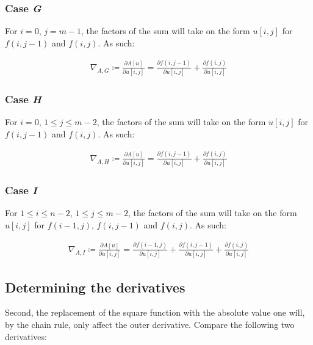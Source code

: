 \documentclass[a4paper]{scrreprt}
\begin{document}
\subsubsection{Case \emph{G}}

For $i = 0$, $j = m -1$, the factors of the sum will take on the form $u[i, j]$
for $f(i, j - 1)$ and $f(i, j)$. As such:

\begin{align*}
		\nabla_{A, G} \coloneqq \frac{\partial A[u]}{\partial u[i, j]} = 
		  \frac{\partial f(i, j - 1)}{\partial u[i, j]}
		  + \frac{\partial f(i, j)}{\partial u[i, j]}
\end{align*}

\subsubsection{Case \emph{H}}

For $i = 0$, $1 \leq j \leq m - 2$, the factors of the sum will take on the
form $u[i, j]$ for $f(i, j - 1)$ and $f(i, j)$. As such:

\begin{align*}
		\nabla_{A, H} \coloneqq \frac{\partial A[u]}{\partial u[i, j]} = 
		  \frac{\partial f(i, j - 1)}{\partial u[i, j]}
		  + \frac{\partial f(i, j)}{\partial u[i, j]}
\end{align*}

\subsubsection{Case \emph{I}}

For $1 \leq i \leq n - 2$, $1 \leq j \leq m - 2$, the factors of the sum will
take on the form $u[i, j]$ for $f(i - 1, j)$, $f(i, j - 1)$ and $f(i, j)$. As
such:

\begin{align*}
		\nabla_{A, I} \coloneqq \frac{\partial A[u]}{\partial u[i, j]} = 
		  \frac{\partial f(i - 1, j)}{\partial u[i, j]}
		  + \frac{\partial f(i, j - 1)}{\partial u[i, j]}
		  + \frac{\partial f(i, j)}{\partial u[i, j]}
\end{align*}

\subsection{Determining the derivatives}

Second, the replacement of the square function with the absolute value one
will, by the chain rule, only affect the outer derivative. Compare the
following two derivatives:
\end{document}
